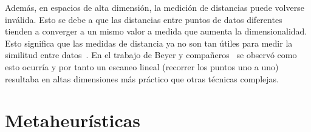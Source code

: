 Además, en espacios de alta dimensión, la medición de distancias puede volverse inválida. Esto se debe a que las distancias entre puntos de datos diferentes tienden a converger a un mismo valor a medida que aumenta la dimensionalidad. Esto significa que las medidas de distancia ya no son tan útiles para medir la similitud entre datos~\cite{peng_interpreting_2024, venkat2018curse}. En el trabajo de Beyer y compañeros~\cite{beyer99nn} se observó como esto ocurría y por tanto un escaneo lineal (recorrer los puntos uno a uno) resultaba en altas dimensiones más práctico que otras técnicas complejas.

\section{Metaheurísticas}